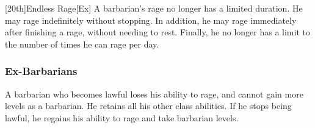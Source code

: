         [20th]{Endless Rage}[Ex]
        A barbarian's rage no longer has a limited duration.
        He may rage indefinitely without stopping.
        In addition, he may rage immediately after finishing a rage, without needing to rest.
        Finally, he no longer has a limit to the number of times he can rage per day.

        \subsubsection{Ex-Barbarians}
            A barbarian who becomes lawful loses his ability to rage, and cannot gain more levels as a barbarian.
            He retains all his other class abilities.
            If he stops being lawful, he regains his ability to rage and take barbarian levels.

